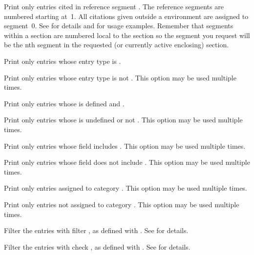 \documentclass{ltxdockit}[2011/03/25]
\begin{document}
\begin{optionlist*}

Print only entries cited in reference segment . The reference segments are numbered starting at~1. All citations given outside a  environment are assigned to segment~0. See  for details and  for usage examples. Remember that segments within a section are numbered local to the section so the segment you request will be the nth segment in the requested (or currently active enclosing) section.


Print only entries whose entry type is .


Print only entries whose entry type is not . This option may be used multiple times.


Print only entries whose  is defined and .


Print only entries whose  is undefined or not . This option may be used multiple times.


Print only entries whose  field includes . This option may be used multiple times.


Print only entries whose  field does not include . This option may be used multiple times.


Print only entries assigned to category . This option may be used multiple times.


Print only entries not assigned to category . This option may be used multiple times.


Filter the entries with filter , as defined with . See  for details.


Filter the entries with check , as defined with . See  for details.


\end{optionlist*}
\end{document}
